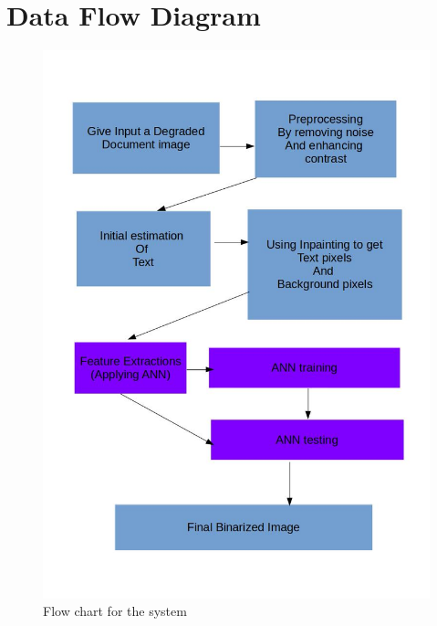 \documentclass[oneside,a4paper,12pt]{report}
\begin{document}
\section{Data Flow Diagram}
\begin{figure}[!htbp]
    \includegraphics[width=\textwidth]{phases.jpg}
	\caption{Flow chart for the system}
\end{figure}

\end{document}
